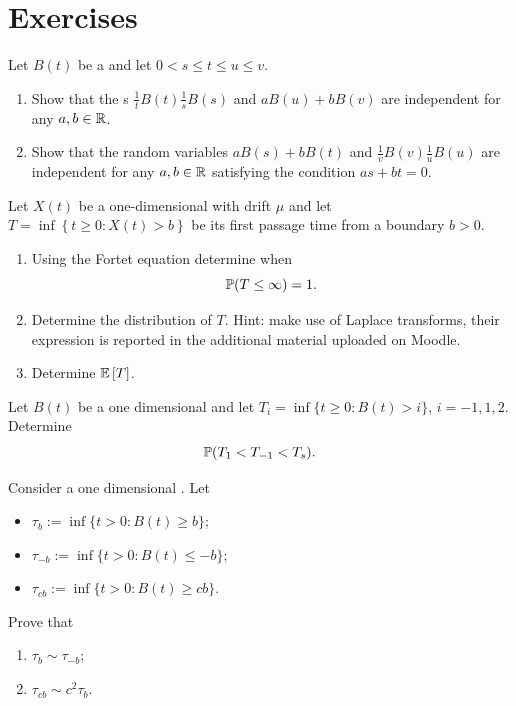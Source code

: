 \documentclass[12pt]{report}
\begin{document}
\section*{Exercises}
\label{sec:exer3}
\begin{exercise}
	Let $B(t)$ be a \bwm{} and let $0<s\leq t\leq u\leq v$.
	\begin{enumerate}
		\item Show that the \rv s $\frac{1}{t}B(t)\frac{1}{s}B(s)$ and $aB(u)+bB(v)$ are independent for any $a,b\in\mathbb{R}$.
		\item Show that the random variables $aB(s)+bB(t)$ and $\frac{1}{v}B(v)\frac{1}{u}B(u)$ are independent for any $a,b\in\mathbb{R}$ satisfying the condition $as+bt=0$.
	\end{enumerate}
\end{exercise}
\begin{exercise}
	Let $X(t)$ be a one-dimensional \bwm{} with drift $\mu$ and let $T=\inf\left\{t\geq0:X(t)>b\right\}$ be its first passage time from a boundary $b>0$.
	\begin{enumerate}
		\item Using the Fortet equation determine when
		\begin{equation*}
			\mathbb{P}(T\leq\infty)=1.
		\end{equation*}
		\item Determine the distribution of $T$. Hint: make use of Laplace transforms, their expression is reported in the additional material uploaded on Moodle.
		\item Determine $\mathbb{E}\left[T\right]$.
	\end{enumerate}
\end{exercise}
\begin{exercise}
	Let $B(t)$ be a one dimensional \bwm{} and let $T_{i}=\inf\{t\geq 0: B(t)>i\}$, $i=-1,1,2$. Determine 
	\begin{equation*}
		\mathbb{P}(T_{1}<T_{-1}<T_{s}).
	\end{equation*}
\end{exercise}
\begin{exercise}
	Consider a one dimensional \bwm. Let
	\begin{itemize}
		\item $\tau_{b}:=\inf\{t>0:B(t)\geq b\}$;
		\item $\tau_{-b}:=\inf\{t>0:B(t)\leq -b\}$;
		\item $\tau_{cb}:=\inf\{t>0:B(t)\geq cb\}$.
	\end{itemize}
	Prove that
	\begin{enumerate}
		\item $\tau_{b}\sim\tau_{-b}$;
		\item $\tau_{cb}\sim c^{2}\tau_{b}$.
	\end{enumerate}
\end{exercise}
\end{document}
